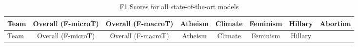 \documentclass[]{article}
\begin{document}
\begin{longtable}[]{@{}lccccccc@{}}
\caption{\label{fig:f1all_table} F1 Scores for all state-of-the-art
models}\tabularnewline
\toprule
\begin{minipage}[b]{0.22\columnwidth}\raggedright
Team\strut
\end{minipage} & \begin{minipage}[b]{0.10\columnwidth}\centering
Overall (F-microT)\strut
\end{minipage} & \begin{minipage}[b]{0.11\columnwidth}\centering
Overall (F-macroT)\strut
\end{minipage} & \begin{minipage}[b]{0.07\columnwidth}\centering
Atheism\strut
\end{minipage} & \begin{minipage}[b]{0.07\columnwidth}\centering
Climate\strut
\end{minipage} & \begin{minipage}[b]{0.07\columnwidth}\centering
Feminism\strut
\end{minipage} & \begin{minipage}[b]{0.07\columnwidth}\centering
Hillary\strut
\end{minipage} & \begin{minipage}[b]{0.07\columnwidth}\centering
Abortion\strut
\end{minipage}\tabularnewline
\midrule
\endfirsthead
\toprule
\begin{minipage}[b]{0.22\columnwidth}\raggedright
Team\strut
\end{minipage} & \begin{minipage}[b]{0.10\columnwidth}\centering
Overall (F-microT)\strut
\end{minipage} & \begin{minipage}[b]{0.11\columnwidth}\centering
Overall (F-macroT)\strut
\end{minipage} & \begin{minipage}[b]{0.07\columnwidth}\centering
Atheism\strut
\end{minipage} & \begin{minipage}[b]{0.07\columnwidth}\centering
Climate\strut
\end{minipage} & \begin{minipage}[b]{0.07\columnwidth}\centering
Feminism\strut
\end{minipage} & \begin{minipage}[b]{0.07\columnwidth}\centering
Hillary\strut
\end{minipage} & \begin{minipage}[b]{0.07\columnwidth}\centering

\end{minipage}
\end{longtable}
\end{document}
